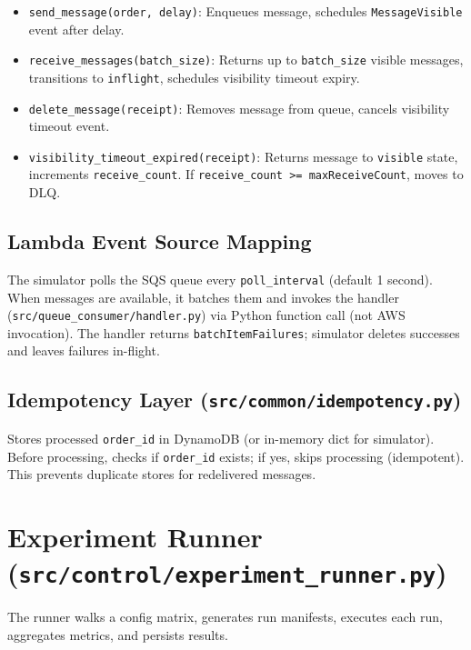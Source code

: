 \begin{itemize}
    \item \texttt{send\_message(order, delay)}: Enqueues message, schedules \texttt{MessageVisible} event after delay.
    
    \item \texttt{receive\_messages(batch\_size)}: Returns up to \texttt{batch\_size} visible messages, transitions to \texttt{inflight}, schedules visibility timeout expiry.
    
    \item \texttt{delete\_message(receipt)}: Removes message from queue, cancels visibility timeout event.
    
    \item \texttt{visibility\_timeout\_expired(receipt)}: Returns message to \texttt{visible} state, increments \texttt{receive\_count}. If \texttt{receive\_count >= maxReceiveCount}, moves to DLQ.
\end{itemize}

\subsection{Lambda Event Source Mapping}

The simulator polls the SQS queue every \texttt{poll\_interval} (default 1 second). When messages are available, it batches them and invokes the handler (\texttt{src/queue\_consumer/handler.py}) via Python function call (not AWS invocation). The handler returns \texttt{batchItemFailures}; simulator deletes successes and leaves failures in-flight.

\subsection{Idempotency Layer (\texttt{src/common/idempotency.py})}

Stores processed \texttt{order\_id} in DynamoDB (or in-memory dict for simulator). Before processing, checks if \texttt{order\_id} exists; if yes, skips processing (idempotent). This prevents duplicate stores for redelivered messages.

\section{Experiment Runner (\texttt{src/control/experiment\_runner.py})}

The runner walks a config matrix, generates run manifests, executes each run, aggregates metrics, and persists results.

